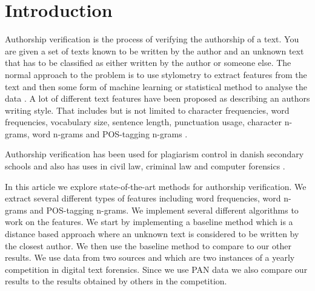 \section{Introduction}
Authorship verification is the process of verifying the authorship of a text.
You are given a set of texts known to be written by the author and an unknown
text that has to be classified as either written by the author or someone else.
The normal approach to the problem is to use stylometry to extract features
from the text and then some form of machine learning or statistical method to
analyse the data \cite{stamatos2009}. A lot of different text features have
been proposed as describing an authors writing style. That includes but is not
limited to character frequencies, word frequencies, vocabulary size, sentence
length, punctuation usage, character n-grams, word n-grams and \gls{POS}-tagging
n-grams \cite{stamatos2009}.

Authorship verification has been used for plagiarism control in danish secondary
schools \cite{hansen2014} and also has uses in civil law, criminal law and
computer forensics \cite{stamatos2009}.

In this article we explore state-of-the-art methods for authorship verification.
We extract several different types of features including word frequencies, word
n-grams and \gls{POS}-tagging n-grams. We implement several different algorithms
to work on the features. We start by implementing a baseline method which is a
distance based approach where an unknown text is considered to be written by
the closest author. We then use the baseline method to compare to our other
results. We use data from two sources \cite{pan:2015} and \cite{pan:2013} which
are two instances of a yearly competition in digital text forensics. Since we
use PAN data we also compare our results to the results obtained by others in
the competition.

